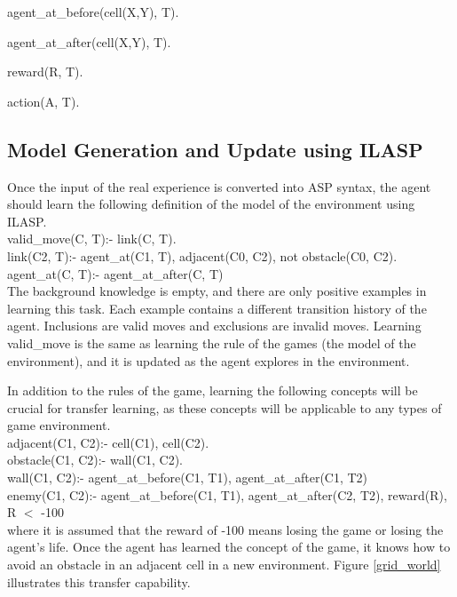 \documentclass[12pt,twoside]{report}
\begin{document}
agent\_at\_before(cell(X,Y), T).

agent\_at\_after(cell(X,Y), T).

reward(R, T).

action(A, T).

\subsection{Model Generation and Update using ILASP}
\label{model_generation_and_update}
Once the input of the real experience is converted into ASP syntax, the agent should learn the following definition of the model of the environment using ILASP. \\

valid\_move(C, T):- link(C, T).
\\
link(C2, T):- agent\_at(C1, T), adjacent(C0, C2), not obstacle(C0, C2).\\
agent\_at(C, T):- agent\_at\_after(C, T) \\

The background knowledge is empty, and there are only positive examples in learning this task. Each example contains a different transition history of the agent. Inclusions are valid moves and exclusions are invalid moves. Learning valid\_move is the same as learning the rule of the games (the model of the environment), and it is updated as the agent explores in the environment.

In addition to the rules of the game, learning the following concepts will be crucial for transfer learning, as these concepts will be applicable to any types of game environment.  \\

adjacent(C1, C2):- cell(C1), cell(C2). \\
obstacle(C1, C2):- wall(C1, C2). \\
wall(C1, C2):- agent\_at\_before(C1, T1), agent\_at\_after(C1, T2) \\
enemy(C1, C2):- agent\_at\_before(C1, T1), agent\_at\_after(C2, T2), reward(R), R $<$ -100 \\

where it is assumed that the reward of -100 means losing the game or losing the agent's life. Once the agent has learned the concept of the game, it knows how to avoid an obstacle in an adjacent cell in a new environment. Figure \ref{grid_world} illustrates this transfer capability.
\end{document}
